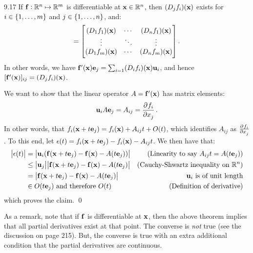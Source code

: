 \begin{theorem}{}{9.17}
    If $\mathbf{f}: \mathbb{R}^n \mapsto \mathbb{R}^m$ is differentiable at $\mathbf{x} \in \mathbb{R}^n$, then $(D_jf_i)(\mathbf{x})$ exists for $i \in \set{1, \ldots, m}$ and $j \in \set{1, \ldots, n}$, and:
    \begin{align*}
        [\v{f}'(\v{x})] = \m{(D_1f_1)(\v{x}) & \cdots & (D_nf_1)(\v{x})
        \\ \vdots & \ddots & \vdots
        \\ (D_1f_m)(\v{x}) & \cdots & (D_nf_m)(\v{x})}.
    \end{align*}
    In other words, we have $\mathbf{f}'(\mathbf{x})\mathbf{e}_j = \sum_{i=1} (D_if_i)(\mathbf{x})\mathbf{u}_i$, and hence $[\mathbf{f}'(\mathbf{x})]_{ij} = (D_jf_i)(\mathbf{x})$. 
\end{theorem}
\begin{nproof}
    We want to show that the linear operator $A = \mathbf{f}'(\mathbf{x})$ has matrix elements:
    \begin{align*}
        \v{u}_iA\v{e}_j = A_{ij} = \dpd{f_i}{x_j}.
    \end{align*}
    In other words, that $f_i(\mathbf{x} + t\mathbf{e}_j) = f_i(\mathbf{x}) + A_{ij}t + O(t)$, which identifies $A_{ij}$ as $\pd{f_i}{x_j}$. To this end, let $\epsilon(t) = f_i(\mathbf{x} + t\mathbf{e}_j) - f_i(\mathbf{x}) - A_{ij}t$. We then have that:
    \begin{align*}
        \abs{\epsilon(t)} &= \abs{\mathbf{u}_i(\mathbf{f}(\mathbf{x} + t\mathbf{e}_j) - \mathbf{f}(\mathbf{x}) - A(t\mathbf{e}_j))} & \text{(Linearity to say $A_{ij}t = A(t\mathbf{e}_j)$)}
        \\ &\leq \abs{\mathbf{u}_j}\abs{\mathbf{f}(\mathbf{x} + t\mathbf{e}_j) - \mathbf{f}(\mathbf{x}) - A(t\mathbf{e}_j)} & \text{(Cauchy-Shwartz inequality on $\mathbb{R}^n$)}
        \\ &= \abs{\mathbf{f}(\mathbf{x} + t\mathbf{e}_j) - \mathbf{f}(\mathbf{x}) - A(t\mathbf{e}_j)} & \text{$\mathbf{u}_i$ is of unit length}
        \\ &\in O(t\mathbf{e}_j) \text{ and therefore } O(t) & \text{(Definition of derivative)}
    \end{align*}
    which proves the claim. \qed
\end{nproof}
\noindent As a remark, note that if $\mathbf{f}$ is differentiable at $\mathbf{x}$, then the above theorem implies that all partial derivatives exist at that point. The converse is \emph{not} true (see the discussion on page 215). But, the converse is true with an extra additional condition that the partial derivatives are continuous.


